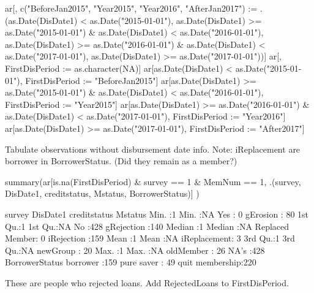 \begin{Schunk}
\begin{Sinput}
ar[, c("BeforeJan2015", "Year2015", "Year2016", "AfterJan2017") :=
   .(as.Date(DisDate1) < as.Date("2015-01-01"),
     as.Date(DisDate1) >= as.Date("2015-01-01") & 
       as.Date(DisDate1) < as.Date("2016-01-01"),
     as.Date(DisDate1) >= as.Date("2016-01-01") & 
       as.Date(DisDate1) < as.Date("2017-01-01"),
    as.Date(DisDate1) >= as.Date("2017-01-01"))]
ar[, FirstDisPeriod := as.character(NA)]
ar[as.Date(DisDate1) < as.Date("2015-01-01"), 
  FirstDisPeriod := "BeforeJan2015"]
ar[as.Date(DisDate1) >= as.Date("2015-01-01") & 
    as.Date(DisDate1) < as.Date("2016-01-01"), 
  FirstDisPeriod := "Year2015"]
ar[as.Date(DisDate1) >= as.Date("2016-01-01") & 
    as.Date(DisDate1) < as.Date("2017-01-01"), 
  FirstDisPeriod := "Year2016"]
ar[as.Date(DisDate1) >= as.Date("2017-01-01"), 
  FirstDisPeriod := "After2017"]
\end{Sinput}
\end{Schunk}
Tabulate observations without disbursement date info. Note: \textsf{iReplacement} are borrower in \textsf{BorrowerStatus}. (Did they remain as a member?)
\begin{Schunk}
\begin{Sinput}
summary(ar[is.na(FirstDisPeriod) & survey == 1 & MemNum == 1, 
  .(survey, DisDate1, creditstatus, Mstatus, BorrowerStatus)] )
\end{Sinput}
\begin{Soutput}
     survey     DisDate1            creditstatus         Mstatus   
 Min.   :1   Min.   :NA    Yes            :  0   gErosion    : 80  
 1st Qu.:1   1st Qu.:NA    No             :428   gRejection  :140  
 Median :1   Median :NA    Replaced Member:  0   iRejection  :159  
 Mean   :1   Mean   :NA                          iReplacement:  3  
 3rd Qu.:1   3rd Qu.:NA                          newGroup    : 20  
 Max.   :1   Max.   :NA                          oldMember   : 26  
             NA's   :428                                           
         BorrowerStatus
 borrower       :159   
 pure saver     : 49   
 quit membership:220   
                       
                       
                       
                       
\end{Soutput}
\end{Schunk}
These are people who rejected loans. Add \textsf{RejectedLoans} to \textsf{FirstDisPeriod}. \gobblepars
